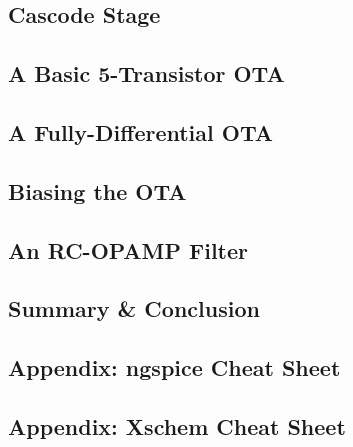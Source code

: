 \documentclass[
  letterpaper,
  DIV=11,
  numbers=noendperiod]{scrartcl}
\begin{document}
\subsection{Cascode Stage}\label{cascode-stage}

\subsection{A Basic 5-Transistor OTA}\label{a-basic-5-transistor-ota}

\subsection{A Fully-Differential OTA}\label{a-fully-differential-ota}

\subsection{Biasing the OTA}\label{biasing-the-ota}

\subsection{An RC-OPAMP Filter}\label{an-rc-opamp-filter}

\subsection{Summary \& Conclusion}\label{summary-conclusion}

\subsection{Appendix: ngspice Cheat
Sheet}\label{appendix-ngspice-cheat-sheet}

\subsection{Appendix: Xschem Cheat
Sheet}\label{appendix-xschem-cheat-sheet}
\end{document}
